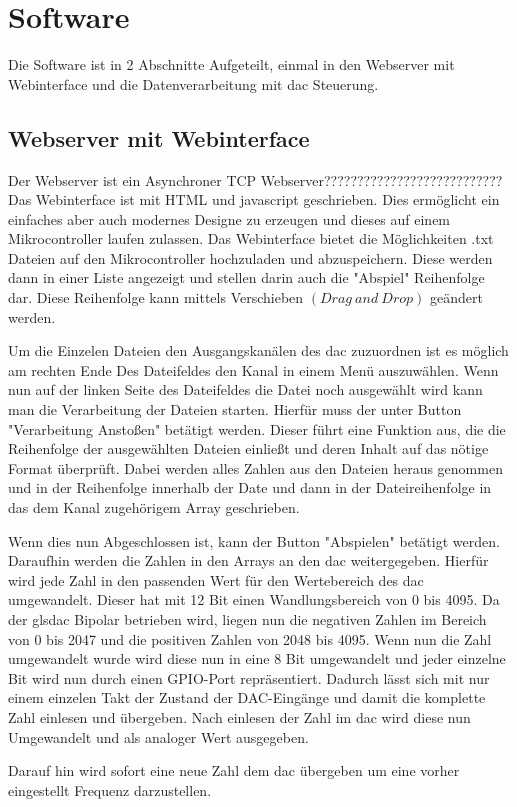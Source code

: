 \chapter{Software}

Die Software ist in 2 Abschnitte Aufgeteilt, einmal in den Webserver mit Webinterface und die Datenverarbeitung mit \gls{dac} Steuerung.

\section{Webserver mit Webinterface}

Der Webserver ist ein Asynchroner TCP Webserver???????????????????????????\\

Das Webinterface ist mit HTML und javascript geschrieben.
Dies ermöglicht ein einfaches aber auch modernes Designe zu erzeugen und dieses auf einem Mikrocontroller laufen zulassen.
Das Webinterface bietet die Möglichkeiten .txt Dateien auf den Mikrocontroller hochzuladen und abzuspeichern.
Diese werden dann in einer Liste angezeigt und stellen darin auch die "Abspiel" Reihenfolge dar.
Diese Reihenfolge kann mittels Verschieben $\left(Drag \ and \ Drop \right)$ geändert werden.

Um die Einzelen Dateien den Ausgangskanälen des \gls{dac} zuzuordnen ist es möglich am rechten Ende Des Dateifeldes den Kanal in einem Menü auszuwählen.
Wenn nun auf der linken Seite des Dateifeldes die Datei noch ausgewählt wird kann man die Verarbeitung der Dateien starten.
Hierfür muss der unter Button "Verarbeitung Anstoßen" betätigt werden.
Dieser führt eine Funktion aus, die die Reihenfolge der ausgewählten Dateien einließt und deren Inhalt auf das nötige Format überprüft.
Dabei werden alles Zahlen aus den Dateien heraus genommen und in der Reihenfolge innerhalb der Date und dann in der Dateireihenfolge in das dem Kanal zugehörigem Array geschrieben.

Wenn dies nun Abgeschlossen ist, kann der Button "Abspielen" betätigt werden.
Daraufhin werden die Zahlen in den Arrays an den \gls{dac} weitergegeben.
Hierfür wird jede Zahl in den passenden Wert für den Wertebereich des \gls{dac} umgewandelt. 
Dieser hat mit 12 Bit einen Wandlungsbereich von 0 bis 4095.
Da der gls{dac} Bipolar betrieben wird, liegen nun die negativen Zahlen im Bereich von 0 bis 2047 und die positiven Zahlen von 2048 bis 4095.
Wenn nun die Zahl umgewandelt wurde wird diese nun in eine 8 Bit umgewandelt und jeder einzelne Bit wird nun durch einen GPIO-Port repräsentiert.
Dadurch lässt sich mit nur einem einzelen Takt der Zustand der DAC-Eingänge und damit die komplette Zahl einlesen und übergeben.
Nach einlesen der Zahl im \gls{dac} wird diese nun Umgewandelt und als analoger Wert ausgegeben.

Darauf hin wird sofort eine neue Zahl dem \gls{dac} übergeben um eine vorher eingestellt Frequenz darzustellen.